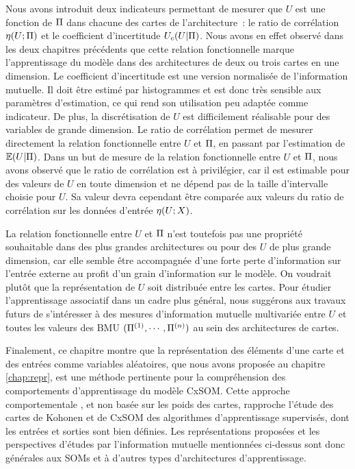 \documentclass[../main]{subfiles}
\begin{document}
Nous avons introduit deux indicateurs permettant de mesurer que $U$ est une fonction de $\Pi$ dans chacune des cartes de l'architecture~: le ratio de corrélation $\eta(U;\Pi)$ et le coefficient d'incertitude $U_c(U|\Pi)$.
Nous avons en effet observé dans les deux chapitres précédents que cette relation fonctionnelle marque l'apprentissage du modèle dans des architectures de deux ou trois cartes en une dimension.
Le coefficient d'incertitude est une version normalisée de l'information mutuelle. Il doit être estimé par histogrammes et est donc très sensible aux paramètres d'estimation, ce qui rend son utilisation peu adaptée comme indicateur. De plus, la discrétisation de $U$ est difficilement réalisable pour des variables de grande dimension.
Le ratio de corrélation permet de mesurer directement la relation fonctionnelle entre $U$ et $\Pi$, en passant par l'estimation de $\mathbb{E}(U|\Pi)$.
Dans un but de mesure de la relation fonctionnelle entre $U$ et $\Pi$, nous avons observé que le ratio de corrélation est à privilégier, car il est estimable pour des valeurs de $U$ en toute dimension et ne dépend pas de la taille d'intervalle choisie pour $U$. Sa valeur devra cependant être comparée aux valeurs du ratio de corrélation sur les données d'entrée $\eta(U;X)$.

La relation fonctionnelle entre $U$ et $\Pi$ n'est toutefois pas une propriété souhaitable dans des plus grandes architectures ou pour des $U$ de plus grande dimension, car elle semble être accompagnée d'une forte perte d'information sur l'entrée externe au profit d'un grain d'information sur le modèle.
On voudrait plutôt que la représentation de $U$ soit distribuée entre les cartes.
Pour étudier l'apprentissage associatif dans un cadre plus général, nous suggérons aux travaux futurs de s'intéresser à des mesures d'information mutuelle multivariée entre $U$ et toutes les valeurs des BMU $(\Pi^{({1})}, \cdots, \Pi^{({n})})$ au sein des architectures de cartes.

Finalement, ce chapitre montre que la représentation des éléments d'une carte et des entrées comme variables aléatoires, que nous avons proposée au chapitre \ref{chap:repr}, est une méthode pertinente pour la compréhension des comportements d'apprentissage du modèle CxSOM.
Cette approche \og comportementale \fg{}, et non basée sur les poids des cartes, rapproche l'étude des cartes de Kohonen et de CxSOM des algorithmes d'apprentissage supervisés, dont les entrées et sorties sont bien définies.
Les représentations proposées et les perspectives d'études par l'information mutuelle mentionnées ci-dessus sont donc générales aux SOMs et à d'autres types d'architectures d'apprentissage. 

\ifSubfilesClassLoaded{
    \printbibliography
}{}
\end{document}
